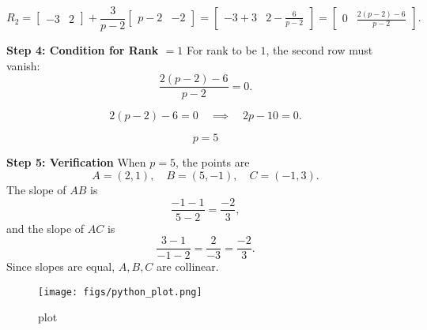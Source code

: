 \documentclass[journal]{IEEEtran}
\begin{document}
\[
R_2 = \begin{bmatrix} -3 & 2 \end{bmatrix} 
+ \frac{3}{p-2}\begin{bmatrix} p-2 & -2 \end{bmatrix}
= \begin{bmatrix} -3 + 3 & 2 - \frac{6}{p-2} \end{bmatrix}
= \begin{bmatrix} 0 & \frac{2(p-2)-6}{p-2} \end{bmatrix}.
\]

\textbf{Step 4: Condition for Rank $=1$}
For rank to be $1$, the second row must vanish:
\[
\frac{2(p-2)-6}{p-2} = 0.
\]

\[
2(p-2) - 6 = 0 \quad \implies \quad 2p - 10 = 0.
\]

\[
\boxed{p = 5}
\]

\textbf{Step 5: Verification}
When $p=5$, the points are
\[
A = (2,1), \quad B = (5,-1), \quad C = (-1,3).
\]
The slope of $AB$ is
\[
\frac{-1-1}{5-2} = \frac{-2}{3},
\]
and the slope of $AC$ is
\[
\frac{3-1}{-1-2} = \frac{2}{-3} = \frac{-2}{3}.
\]
Since slopes are equal, $A,B,C$ are collinear.









\begin{figure}[htbp]
\centering
\texttt{[image: figs/python\_plot.png]} 
\caption{plot}
\label{fig:1}
\end{figure}
\end{document}
